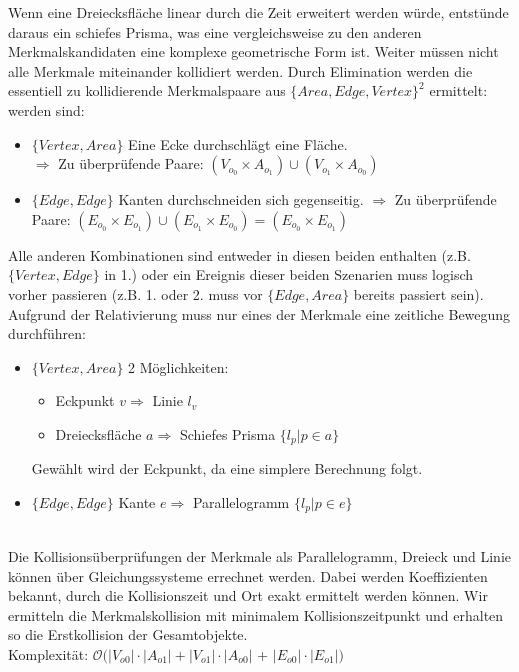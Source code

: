 Wenn eine Dreiecksfläche linear durch die Zeit erweitert werden würde, entstünde daraus ein schiefes Prisma, was eine vergleichsweise zu den anderen Merkmalskandidaten eine  komplexe geometrische Form ist. Weiter müssen nicht alle Merkmale miteinander kollidiert werden. Durch Elimination werden die essentiell zu kollidierende Merkmalspaare aus $\{Area, Edge, Vertex\}^2$ ermittelt:
 werden  sind:
		\begin{itemize}
			\item $\{Vertex, Area\}$ Eine Ecke durchschlägt eine Fläche.\\
				$\Rightarrow$ Zu überprüfende Paare: $(V_{o_0}\times A_{o_1})\cup (V_{o_1}\times A_{o_0})$
			\item $\{Edge, Edge\}$ Kanten durchschneiden sich gegenseitig.
				$\Rightarrow$ Zu überprüfende Paare: $(E_{o_0}\times E_{o_1})\cup (E_{o_1}\times E_{o_0}) = (E_{o_0}\times E_{o_1})$
		\end{itemize}
		Alle anderen Kombinationen sind entweder in diesen beiden enthalten (z.B. $\{Vertex, Edge\}$ in 1.) oder ein Ereignis dieser beiden Szenarien muss logisch vorher passieren (z.B. 1. oder 2. muss vor $\{Edge, Area\}$ bereits passiert sein).
\ \\
		Aufgrund der Relativierung muss nur eines der Merkmale eine zeitliche Bewegung durchführen:
		\begin{itemize}
			\item $\{Vertex, Area\}$ 2 Möglichkeiten:
				\begin{itemize}
					\item Eckpunkt $v \Rightarrow$ Linie $l_v$
					\item Dreiecksfläche $a \Rightarrow$ Schiefes Prisma $ \{l_p | p \in a\}$
				\end{itemize}
				Gewählt wird der Eckpunkt, da eine simplere Berechnung folgt.
			\item $\{Edge, Edge\}$ Kante $e \Rightarrow$ Parallelogramm $\{l_p | p \in e\}$
		\end{itemize}
\ \\
		Die Kollisionsüberprüfungen der Merkmale als Parallelogramm, Dreieck und Linie können über Gleichungssysteme errechnet werden. Dabei werden Koeffizienten bekannt, durch die Kollisionszeit und Ort exakt ermittelt werden können. Wir ermitteln die Merkmalskollision mit minimalem Kollisionszeitpunkt und erhalten so die Erstkollision der Gesamtobjekte.\\
		Komplexität: $\mathcal{O}(|V_{o0}|\cdot  |A_{o1}| + |V_{o1}|\cdot |A_{o0}|$ + $|E_{o0}| \cdot  |E_{o1}|)$

